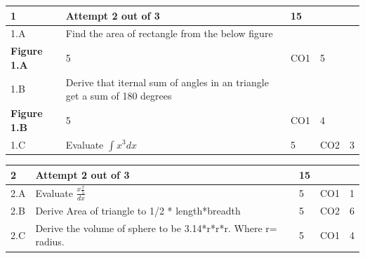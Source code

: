 \documentclass[12pt]{article}
\begin{document}
	\begin{longtable}{|L{1cm}|L{8cm}|C{1cm}|C{1cm}|C{1cm}|}\hline
			\bf1 & \bf{Attempt} \bf2 out of \bf3 & \bf15 & & \\ \hline
				1.A &
	Find the area of rectangle from the below figure \newline
		\begin{center}
		\includegraphics[width=4cm,height=3cm]{media/diagrams/2020/09/14/rectsquare.png}\\\bf{Figure }\bf1.A	
	\end{center}

	
		 &  5 & CO1 & 5\\ \hline
		1.B &
	Derive that iternal sum of angles in an triangle get a sum of 180 degrees \newline
		\begin{center}
		\includegraphics[width=4cm,height=3cm]{media/diagrams/2020/09/14/rectsquare_k3vvwfe.png}\\\bf{Figure }\bf1.B	
	\end{center}

	
		 &  5 & CO1 & 4\\ \hline
		1.C &
	Evaluate $\int x^{3}dx$ \newline
		 &  5 & CO2 & 3\\ \hline
		\end{longtable}

	
	


	
	
		

	
	
	\begin{longtable}{|L{1cm}|L{8cm}|C{1cm}|C{1cm}|C{1cm}|}\hline
			\bf2 & \bf{Attempt} \bf2 out of \bf3 & \bf15 & & \\ \hline
				2.A &
	Evaluate $\frac{x\frac{x}{5}}{dx}$ \newline
		 &  5 & CO1 & 1\\ \hline
		2.B &
	Derive Area of triangle to 1/2 * length*breadth \newline
		 &  5 & CO2 & 6\\ \hline
		2.C &
	Derive the volume of sphere to be 3.14*r*r*r. Where r= radius. \newline
		 &  5 & CO1 & 4\\ \hline
		\end{longtable}

	
	


	
	
		
	
\end{document}
